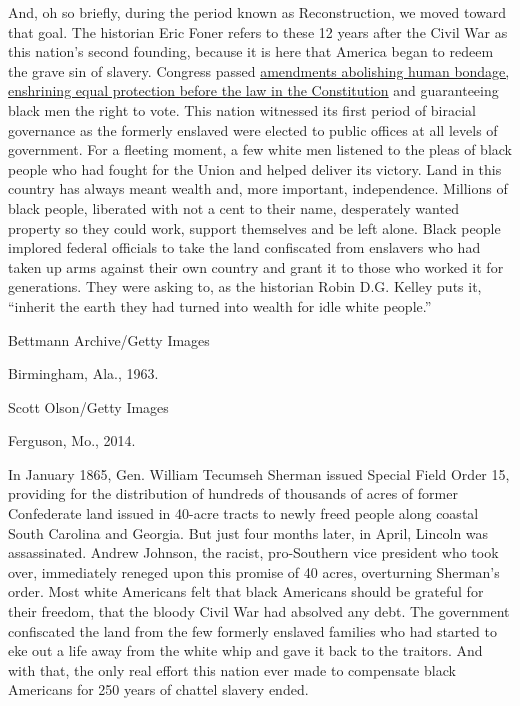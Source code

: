 And, oh so briefly, during the period known as Reconstruction, we moved
toward that goal. The historian Eric Foner refers to these 12 years
after the Civil War as this nation's second founding, because it is here
that America began to redeem the grave sin of slavery. Congress passed
\href{https://constitutioncenter.org/learn/educational-resources/historical-documents/the-reconstruction-amendments}{amendments
abolishing human bondage, enshrining equal protection before the law in
the Constitution} and guaranteeing black men the right to vote. This
nation witnessed its first period of biracial governance as the formerly
enslaved were elected to public offices at all levels of government. For
a fleeting moment, a few white men listened to the pleas of black people
who had fought for the Union and helped deliver its victory. Land in
this country has always meant wealth and, more important, independence.
Millions of black people, liberated with not a cent to their name,
desperately wanted property so they could work, support themselves and
be left alone. Black people implored federal officials to take the land
confiscated from enslavers who had taken up arms against their own
country and grant it to those who worked it for generations. They were
asking to, as the historian Robin D.G. Kelley puts it, ``inherit the
earth they had turned into wealth for idle white people.''

Bettmann Archive/Getty Images

Birmingham, Ala., 1963.

Scott Olson/Getty Images

Ferguson, Mo., 2014.

In January 1865, Gen. William Tecumseh Sherman issued Special Field
Order 15, providing for the distribution of hundreds of thousands of
acres of former Confederate land issued in 40-acre tracts to newly freed
people along coastal South Carolina and Georgia. But just four months
later, in April, Lincoln was assassinated. Andrew Johnson, the racist,
pro-Southern vice president who took over, immediately reneged upon this
promise of 40 acres, overturning Sherman's order. Most white Americans
felt that black Americans should be grateful for their freedom, that the
bloody Civil War had absolved any debt. The government confiscated the
land from the few formerly enslaved families who had started to eke out
a life away from the white whip and gave it back to the traitors. And
with that, the only real effort this nation ever made to compensate
black Americans for 250 years of chattel slavery ended.

